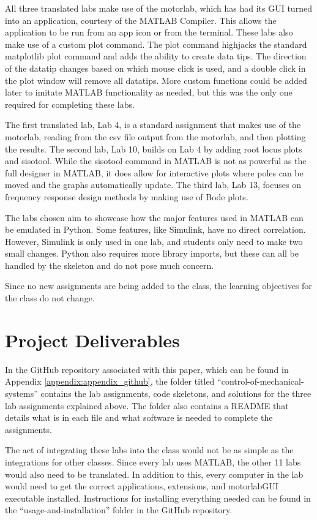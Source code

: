All three translated labs make use of the motorlab, which has had its GUI turned into an application, courtesy of the MATLAB
Compiler. This allows the application to be run from an app icon or from the terminal. These labs also make use of a custom plot
command. The plot command highjacks the standard matplotlib plot command and adds the ability to create data tips. The
direction of the datatip changes based on which mouse click is used, and a double click in the plot window will remove all datatips.
More custom functions could be added later to imitate MATLAB functionality as needed, but this was the only one required for
completing these labs.

The first translated lab, Lab 4, is a standard assignment that makes use of the motorlab, reading from the csv file output from the
motorlab, and then plotting the results. The second lab, Lab 10, builds on Lab 4 by adding root locus plots and sisotool. While the
sisotool command in MATLAB is not as powerful as the full designer in MATLAB, it does allow for interactive plots where poles can
be moved and the graphs automatically update. The third lab, Lab 13, focuses on frequency response design methods by making use
of Bode plots.

The labs chosen aim to showcase how the major features used in MATLAB can be emulated in Python. Some features, like Simulink, have
no direct correlation. However, Simulink is only used in one lab, and students only need to make two small changes. Python also
requires more library imports, but these can all be handled by the skeleton and do not pose much concern.

Since no new assignments are being added to the class, the learning objectives for the class do not change.

\section{Project Deliverables}

In the GitHub repository associated with this paper, which can be found in Appendix \ref{appendix:appendix_github},
the folder titled ``control-of-mechanical-systems'' contains the lab assignments, code skeletons, and solutions for the three
lab assignments explained above. The folder also contains a README that details what is in each file and what software is needed 
to complete the assignments. 

The act of integrating these labs into the class would not be as simple as the integrations for other classes. Since every lab 
uses MATLAB, the other 11 labs would also need to be translated. In addition to this, every computer in the lab would need to 
get the correct applications, extensions, and motorlabGUI executable installed. Instructions for installing everything needed 
can be found in the ``usage-and-installation'' folder in the GitHub repository.
